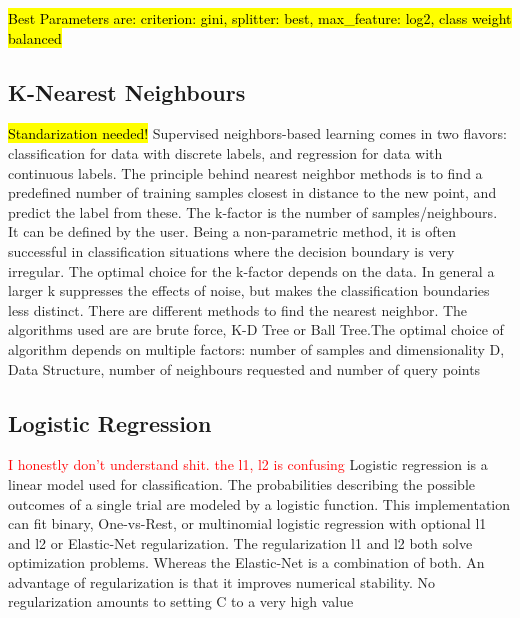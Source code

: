 \documentclass[11pt]{article}
\begin{document}
	\hl{Best Parameters are:  criterion: gini, splitter: best, max\_feature: log2, class weight balanced}

	
	\subsection{K-Nearest Neighbours}
	\hl{Standarization needed!}
	Supervised neighbors-based learning comes in two flavors: classification for data with discrete labels, and regression for data with continuous labels. The principle behind nearest neighbor methods is to find a predefined number of training samples closest in distance to the new point, and predict the label from these. The k-factor is the number of samples/neighbours. It can be defined by the user. Being a non-parametric method, it is often successful in classification situations where the decision boundary is very irregular. The optimal choice for the k-factor depends on the data. In general a larger k suppresses the effects of noise, but makes the classification boundaries less distinct. There are different methods to find the nearest neighbor. The algorithms used are are brute force, K-D Tree or Ball Tree.The optimal choice of algorithm depends on multiple factors: number of samples and dimensionality D, Data Structure, number of neighbours requested  and number of query points

	
	\subsection{Logistic Regression}
	\textcolor{red}{I honestly don't understand shit. the l1, l2 is confusing}
	\medbreak
	Logistic regression is a linear model used for classification. The probabilities describing the possible outcomes of a single trial are modeled by a logistic function. This implementation can fit binary, One-vs-Rest, or multinomial logistic regression with optional l1 and l2 or Elastic-Net regularization. The regularization l1 and l2 both solve optimization problems. Whereas the Elastic-Net is a combination of both. An advantage of regularization is that it improves numerical stability. No regularization amounts to setting C to a very high value

	
\end{document}
